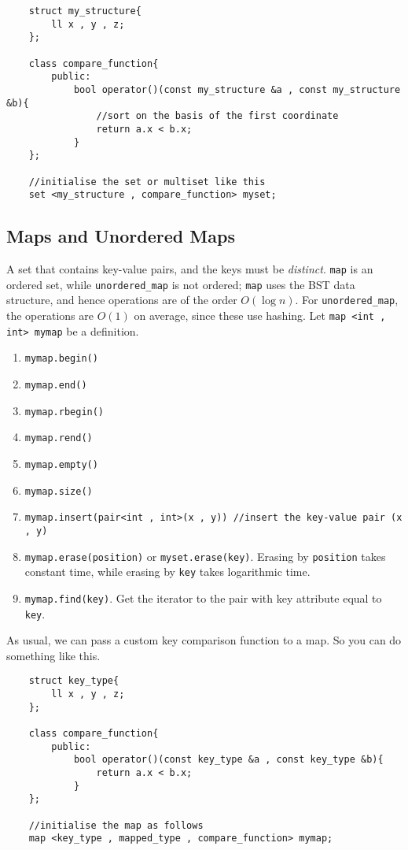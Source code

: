 \documentclass[12pt,a4paper]{amsart}
\numberwithin{equation}{section}
\theoremstyle{definition}
\begin{document}
\begin{lstlisting}
    struct my_structure{
        ll x , y , z;
    };

    class compare_function{
        public:
            bool operator()(const my_structure &a , const my_structure &b){
                //sort on the basis of the first coordinate
                return a.x < b.x;
            }
    };
    
    //initialise the set or multiset like this 
    set <my_structure , compare_function> myset;
\end{lstlisting}

\subsection{Maps and Unordered Maps} A set that contains key-value pairs, and the keys must be \textit{distinct}. \verb|map| is an ordered set, while \verb|unordered_map| is not ordered; \verb|map| uses the BST data structure, and hence operations are of the order $O(\log n)$. For \verb|unordered_map|, the operations are $O(1)$ on average, since these use hashing. Let \verb|map <int , int> mymap| be a definition. 
\begin{enumerate}
    \item \verb|mymap.begin()|
    \item \verb|mymap.end()|
    \item \verb|mymap.rbegin()|
    \item \verb|mymap.rend()|
    \item \verb|mymap.empty()|
    \item \verb|mymap.size()|
    \item \verb|mymap.insert(pair<int , int>(x , y)) //insert the key-value pair (x , y)|
    \item \verb|mymap.erase(position)| or \verb|myset.erase(key)|. Erasing by \verb|position| takes constant time, while erasing by \verb|key| takes logarithmic time.
    \item \verb|mymap.find(key)|. Get the iterator to the pair with key attribute equal to \verb|key|.
\end{enumerate}
\noindent As usual, we can pass a custom key comparison function to a map. So you can do something like this. 

\begin{lstlisting}
    struct key_type{
        ll x , y , z;
    };

    class compare_function{
        public:
            bool operator()(const key_type &a , const key_type &b){
                return a.x < b.x;
            }
    };
    
    //initialise the map as follows 
    map <key_type , mapped_type , compare_function> mymap;
\end{lstlisting}
\end{document}
